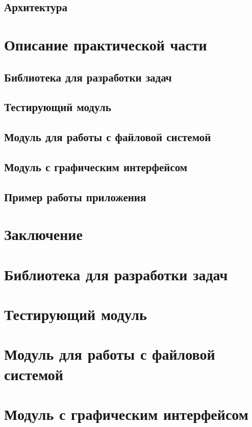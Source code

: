 \section{Архитектура}


\chapter{Описание практической части}
\section{Библиотека для разработки задач}

\section{Тестирующий модуль}

\section{Модуль для работы с файловой системой}

\section{Модуль с графическим интерфейсом}

\section{Пример работы приложения}


\chapter*{Заключение}




\newpage
\appendix
{}
\footnotesize
\chapter{Библиотека для разработки задач}

\chapter{Тестирующий модуль}

\chapter{Модуль для работы с файловой системой}

\chapter{Модуль с графическим интерфейсом}


